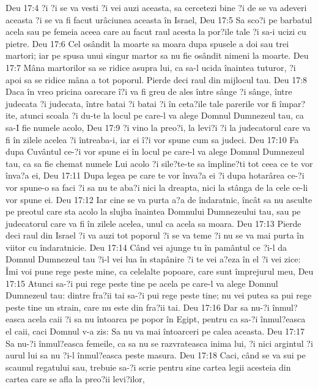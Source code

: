 Deu 17:4  ?i ?i se va vesti ?i vei auzi aceasta, sa cercetezi bine ?i de se va adeveri aceasta ?i se va fi facut urâciunea aceasta în Israel,
Deu 17:5  Sa sco?i pe barbatul acela sau pe femeia aceea care au facut raul acesta la por?ile tale ?i sa-i ucizi cu pietre.
Deu 17:6  Cel osândit la moarte sa moara dupa spusele a doi sau trei martori; iar pe spusa unui singur martor sa nu fie osândit nimeni la moarte.
Deu 17:7  Mâna martorilor sa se ridice asupra lui, ca sa-l ucida înaintea tuturor, ?i apoi sa se ridice mâna a tot poporul. Pierde deci raul din mijlocul tau.
Deu 17:8  Daca în vreo pricina oarecare î?i va fi greu de ales între sânge ?i sânge, între judecata ?i judecata, între batai ?i batai ?i în ceta?ile tale parerile vor fi împar?ite, atunci scoala ?i du-te la locul pe care-l va alege Domnul Dumnezeul tau, ca sa-I fie numele acolo,
Deu 17:9  ?i vino la preo?i, la levi?i ?i la judecatorul care va fi în zilele acelea ?i întreaba-i, iar ei î?i vor spune cum sa judeci.
Deu 17:10  Fa dupa Cuvântul ce-?i vor spune ei în locul pe care-l va alege Domnul Dumnezeul tau, ca sa fie chemat numele Lui acolo ?i sile?te-te sa împline?ti tot ceea ce te vor înva?a ei,
Deu 17:11  Dupa legea pe care te vor înva?a ei ?i dupa hotarârea ce-?i vor spune-o sa faci ?i sa nu te aba?i nici la dreapta, nici la stânga de la cele ce-li vor spune ei.
Deu 17:12  Iar cine se va purta a?a de îndaratnic, încât sa nu asculte pe preotul care sta acolo la slujba înaintea Domnului Dumnezeului tau, sau pe judecatorul care va fi în zilele acelea, unul ca acela sa moara.
Deu 17:13  Pierde deci raul din Israel ?i va auzi tot poporul ?i se va teme ?i nu se va mai purta în viitor cu îndaratnicie.
Deu 17:14  Când vei ajunge tu în pamântul ce ?i-l da Domnul Dumnezeul tau ?i-l vei lua în stapânire ?i te vei a?eza în el ?i vei zice: Îmi voi pune rege peste mine, ca celelalte popoare, care sunt împrejurul meu,
Deu 17:15  Atunci sa-?i pui rege peste tine pe acela pe care-l va alege Domnul Dumnezeul tau: dintre fra?ii tai sa-?i pui rege peste tine; nu vei putea sa pui rege peste tine un strain, care nu este din fra?ii tai.
Deu 17:16  Dar sa nu-?i înmul?easca acela caii ?i sa nu întoarca pe popor în Egipt, pentru ca sa-?i înmul?easca el caii, caci Domnul v-a zis: Sa nu va mai întoarceri pe calea aceasta.
Deu 17:17  Sa nu-?i înmul?easca femeile, ca sa nu se razvrateasca inima lui, ?i nici argintul ?i aurul lui sa nu ?i-l înmul?easca peste masura.
Deu 17:18  Caci, când se va sui pe scaunul regatului sau, trebuie sa-?i scrie pentru sine cartea legii acesteia din cartea care se afla la preo?ii levi?ilor,
